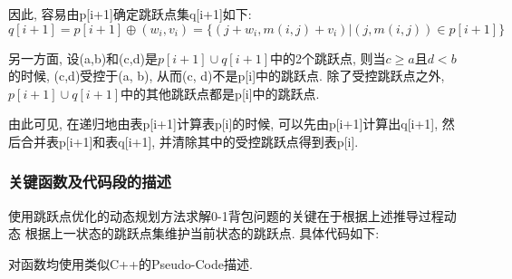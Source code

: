 因此, 容易由p[i+1]确定跳跃点集q[i+1]如下:
\begin{equation}
	q[i+1]=p[i+1]\oplus (w_i,v_i)=\{(j+w_i,m(i,j)+v_i)|(j,m(i,j))\in p[i+1]\}
	\label{eq:jumpSet}
\end{equation}

另一方面, 设(a,b)和(c,d)是$p[i+1]\cup q[i+1]$中的2个跳跃点, 则当$c\geq
	a$且$d<b$的时候, (c,d)受控于(a, b), 从而(c, d)不是p[i]中的跳跃点.
除了受控跳跃点之外, $p[i+1]\cup q[i+1]$中的其他跳跃点都是p[i]中的跳跃点.\par

由此可见, 在递归地由表p[i+1]计算表p[i]的时候, 可以先由p[i+1]计算出q[i+1],
然后合并表p[i+1]和表q[i+1], 并清除其中的受控跳跃点得到表p[i].

\subsubsection{关键函数及代码段的描述}
使用跳跃点优化的动态规划方法求解0-1背包问题的关键在于根据上述推导过程动态
根据上一状态的跳跃点集维护当前状态的跳跃点. 具体代码如下:\par
对函数均使用类似C++的Pseudo-Code描述.

